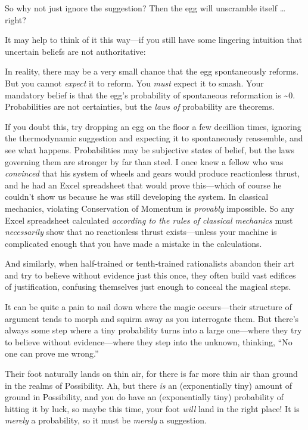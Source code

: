 {
 So why not just ignore the suggestion? Then the egg will
unscramble itself \ldots right?}

{
 It may help to think of it this way---if you still have some
lingering intuition that uncertain beliefs are not authoritative:}

{
 In reality, there may be a very small chance that the egg
spontaneously reforms. But you cannot \textit{expect} it to reform. You
\textit{must} expect it to smash. Your mandatory belief is that the
egg's probability of spontaneous reformation is \~{}0.
Probabilities are not certainties, but the \textit{laws of} probability
are theorems.}

{
 If you doubt this, try dropping an egg on the floor a few
decillion times, ignoring the thermodynamic suggestion and expecting it
to spontaneously reassemble, and see what happens. Probabilities may be
subjective states of belief, but the laws governing them are stronger
by far than steel. I once knew a fellow who was \textit{convinced} that
his system of wheels and gears would produce reactionless thrust, and
he had an Excel spreadsheet that would prove this---which of course he
couldn't show us because he was still developing the
system. In classical mechanics, violating Conservation of Momentum is
\textit{provably} impossible. So any Excel spreadsheet calculated
\textit{according to the rules of classical mechanics} must
\textit{necessarily} show that no reactionless thrust exists---unless
your machine is complicated enough that you have made a mistake in the
calculations.}

{
 And similarly, when half-trained or tenth-trained rationalists
abandon their art and try to believe without evidence just this once,
they often build vast edifices of justification, confusing themselves
just enough to conceal the magical steps.}

{
 It can be quite a pain to nail down where the magic occurs---their
structure of argument tends to morph and squirm away as you interrogate
them. But there's always some step where a tiny
probability turns into a large one---where they try to believe without
evidence---where they step into the unknown, thinking,
``No one can prove me wrong.''}

{
 Their foot naturally lands on thin air, for there is far more thin
air than ground in the realms of Possibility. Ah, but there \textit{is}
an (exponentially tiny) amount of ground in Possibility, and you do
have an (exponentially tiny) probability of hitting it by luck, so
maybe this time, your foot \textit{will} land in the right place! It is
\textit{merely} a probability, so it must be \textit{merely} a
suggestion.}

